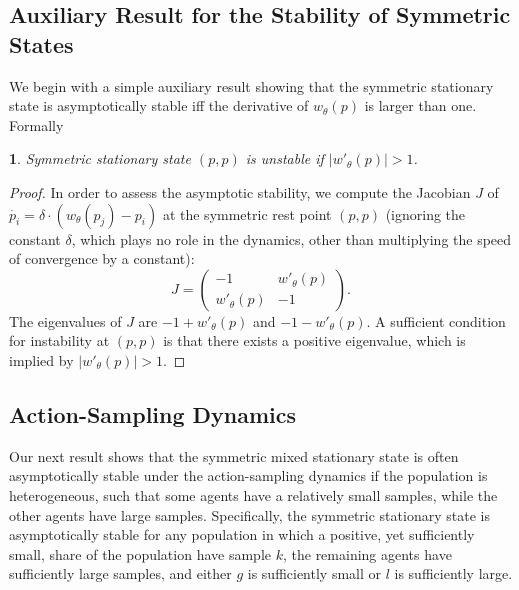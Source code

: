 \documentclass[12pt]{article}
\numberwithin{equation}{section}
\numberwithin{figure}{section}
\theoremstyle{definition}
\theoremstyle{plain}
\theoremstyle{plain}
\newtheorem{prop}{\protect\propositionname}
\theoremstyle{plain}
\theoremstyle{remark}
\theoremstyle{plain}
\theoremstyle{plain}
\providecommand{\propositionname}{Proposition}
\begin{document}
\subsection{Auxiliary Result for the Stability of  Symmetric States}
We begin with a simple auxiliary result showing that the symmetric stationary state is asymptotically stable iff the derivative of $w_\theta (p)$ is larger than one. Formally
\begin{prop}
Symmetric stationary state $(p,p)$ is unstable if $|w'_\theta (p)|>1$.\label{prop-symmetric-stablity}
\end{prop}
\begin{proof}
In order to assess the asymptotic stability, we compute the Jacobian $J$ of $\dot{p_i}=\delta\cdot(w_\theta(p_j)-p_i)$ at the symmetric rest point $(p, p)$ 
(ignoring the constant $\delta$, which plays no role in the dynamics, other than multiplying the speed of convergence by a constant): 
$$
J =  \left( \begin{array}{cc}
-1 & w'_\theta(p)  \\
w'_\theta(p) & -1  \end{array} \right).
$$
The eigenvalues of $J$ are $-1+w'_\theta(p)$ and $-1-w'_\theta(p).$ A sufficient condition for instability at $(p,p)$ is that there exists a positive eigenvalue, which is implied by $|w'_\theta(p)| > 1.$ 
\end{proof}
\subsection{Action-Sampling
Dynamics\label{subsec:Instability-of-symemtric-action-dyanmics}}
Our next result shows that the symmetric mixed stationary state is often asymptotically stable under the action-sampling dynamics if the population is heterogeneous, such that some agents have a relatively small samples, while the other agents have large samples.
Specifically, the symmetric stationary state is asymptotically stable for any population in which a positive, yet sufficiently small, share of the population have sample $k$, the remaining agents have sufficiently large samples, and either $g$ is sufficiently small or $l$ is sufficiently large.
\end{document}
